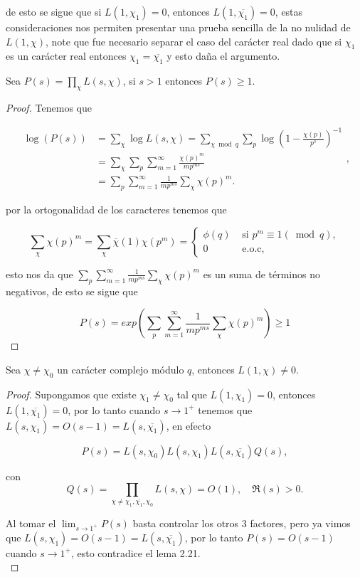 de esto se sigue que si $L(1,\chi_1)=0$, entonces $L(1,\overline{\chi_1})=0$, estas consideraciones nos permiten presentar una prueba sencilla de la no nulidad de $L(1,\chi)$, note que fue necesario separar el caso del carácter real dado que si $\chi_1$ es un carácter real entonces $\chi_1=\overline{\chi_1}$ y esto daña el argumento.

\begin{lemma}
Sea $P(s)=\displaystyle\prod_{\chi}L(s,\chi)$, si $s>1$ entonces $P(s)\geq 1$.
\end{lemma}

\begin{proof}
Tenemos que

$$\begin{aligned}
\log (P(s)) & =\sum_{\chi} \log L(s, \chi)=\sum_{\chi \bmod q} \sum_p \log \left(1-\frac{\chi(p)}{p^s}\right)^{-1} \\
& =\sum_{\chi} \sum_p \sum_{m=1}^{\infty} \frac{\chi(p)^m}{mp^{m s}} \\
& =\sum_p \sum_{m=1}^{\infty} \frac{1}{mp^{ms}} \sum_{\chi} \chi(p)^m .
\end{aligned},$$

por la ortogonalidad de los caracteres tenemos que

$$\sum_{\chi} \chi(p)^m=\sum_{\chi}\overline{\chi}(1) \chi\left(p^m\right)= \begin{cases}\phi(q) & \text { si } p^m \equiv 1 (\bmod{q}), \\ 0 & \text { e.o.c, }\end{cases}$$


esto nos da que $\displaystyle\sum_p \sum_{m=1}^{\infty} \frac{1}{mp^{ms}} \sum_{\chi} \chi(p)^m$ es un suma de términos no negativos, de esto se sigue que

$$P(s)=exp\left(\sum_p \sum_{m=1}^{\infty} \frac{1}{mp^{ms}} \sum_{\chi} \chi(p)^m\right)\geq 1$$
\end{proof}

\begin{theorem}
Sea $\chi\neq \chi_0$ un carácter complejo módulo $q$, entonces $L(1,\chi)\neq 0$.
\end{theorem}

\begin{proof}
Supongamos que existe $\chi_1\neq \chi_0$ tal que $L(1,\chi_1)=0$, entonces $L(1,\overline{\chi_1})=0$, por lo tanto cuando $s\to 1^{+}$ tenemos que $L(s,\chi_1)=O(s-1)=L(s,\overline{\chi_1})$, en efecto

$$P(s)=L(s,\chi_0)L(s,\chi_1)L(s,\overline{\chi_1})Q(s),$$

con $$Q(s)=\prod_{\chi\neq \chi_1,\overline{\chi_1},\chi_0}L(s,\chi)=O(1), \quad \Re(s)>0.$$


Al tomar el $\displaystyle \lim_{s \to 1^{+}} P(s)$ basta controlar los otros 3 factores, pero ya vimos que $L(s,\chi_1)=O(s-1)=L(s,\overline{\chi_1})$, por lo tanto $P(s)=O(s-1)$ cuando $s\to 1^{+}$, esto contradice el lema 2.21.\\
\end{proof}

